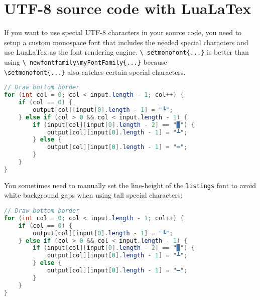 \documentclass{article}
\begin{document}
\section*{UTF-8 source code with LuaLaTex}

\noindent If you want to use special UTF-8 characters in your source code, you
need to setup a custom monospace font that includes the needed special
characters and use LuaLaTex as the font rendering engine. \texttt{\textbackslash
setmonofont\{...\}} is better than using \texttt{\textbackslash
newfontfamily\textbackslash myFontFamily\{...\}} because \\
\texttt{\textbackslash setmonofont\{...\}} also catches certain special
characters.

\medskip

\begin{lstlisting}[language = java]
// Draw bottom border
for (int col = 0; col < input.length - 1; col++) {
    if (col == 0) {
        output[col][input[0].length - 1] = "┗";
    } else if (col > 0 && col < input.length - 1) { 
        if (input[col][input[0].length - 2] == "▉") {
            output[col][input[0].length - 1] = "┻";
        } else {
            output[col][input[0].length - 1] = "━";
        }  
    }
}
\end{lstlisting}


\medskip\noindent You sometimes need to manually set the line-height of the
\texttt{listings} font to avoid white background gaps when using tall special
characters:

\medskip


\begin{lstlisting}[language = java]
// Draw bottom border
for (int col = 0; col < input.length - 1; col++) {
    if (col == 0) {
        output[col][input[0].length - 1] = "┗";
    } else if (col > 0 && col < input.length - 1) { 
        if (input[col][input[0].length - 2] == "▉") {
            output[col][input[0].length - 1] = "┻";
        } else {
            output[col][input[0].length - 1] = "━";
        }  
    }
}
\end{lstlisting}
\end{document}
